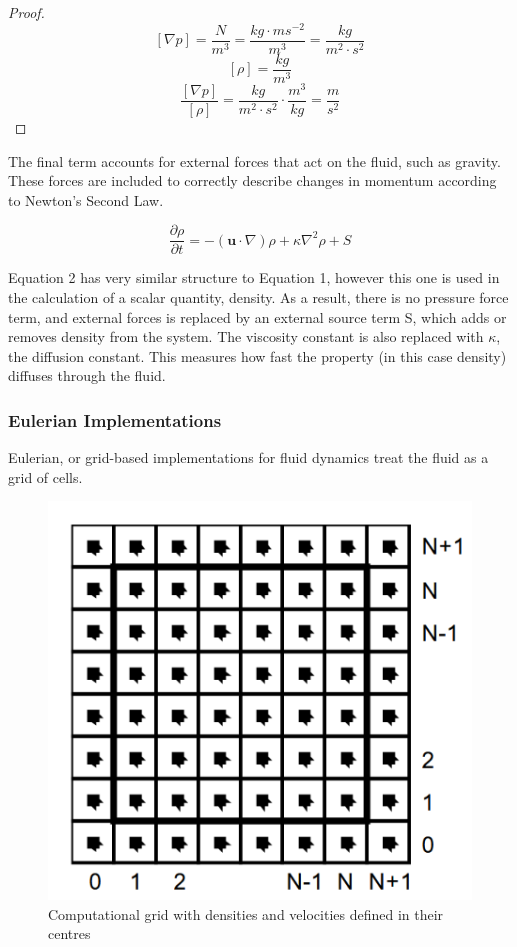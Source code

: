 \documentclass[12pt]{article}
\begin{document}
    \begin{proof}
        $$\left[\nabla{p}\right] = \frac{N}{m^3} = \frac{kg \cdot ms^{-2}}{m^3} = \frac{kg}{m^2\cdot s^2}$$
        $$\left[\rho\right] = \frac{kg}{m^3}$$
        $$\frac{\left[\nabla{p}\right]}{\left[\rho\right]} = \frac{kg}{m^2 \cdot s^2} \cdot \frac{m^3}{kg} = \frac{m}{s^2}$$
    \end{proof}
    
    The final term accounts for external forces that act on the fluid, such as gravity. These forces are included to correctly describe changes in momentum according to Newton's Second Law.

    \begin{equation}
        \frac{\partial{\rho}}{\partial{t}} = -(\textbf{u}\cdot\nabla)\rho + \kappa\nabla^2 \rho + S
    \end{equation}

    Equation 2 has very similar structure to Equation 1, however this one is used in the calculation of a scalar quantity, density. As a result, there is no pressure force term, and external forces is replaced by an external source term S, which adds or removes density from the system. The viscosity constant is also replaced with $\kappa$, the diffusion constant. This measures how fast the property (in this case density) diffuses through the fluid.

    \subsubsection{Eulerian Implementations}

    Eulerian, or grid-based implementations for fluid dynamics treat the fluid as a grid of cells.
    
    \begin{figure}[H]
        \begin{center}
            \includegraphics{gridFluid.png}
        \end{center}
        \caption{Computational grid with densities and velocities defined in their centres \cite{stam}}   
    \end{figure}
\end{document}
